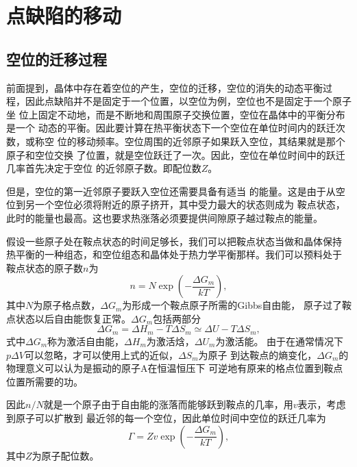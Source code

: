     \section{点缺陷的移动}
        \subsection{空位的迁移过程}
            前面提到，晶体中存在着空位的产生，空位的迁移，空位的消失的动态平衡过
            程，因此点缺陷并不是固定于一个位置，以空位为例，空位也不是固定于一个原子坐
            位上固定不动地，而是不断地和周围原子交换位置，空位在晶体中的平衡分布是一个
            动态的平衡。因此要计算在热平衡状态下一个空位在单位时间内的跃迁次数，或称空
            位的移动频率。空位周围的近邻原子如果跃入空位，其结果就是那个原子和空位交换
            了位置，就是空位跃迁了一次。因此，空位在单位时间中的跃迁几率首先决定于空位
            的近邻原子数。即配位数$Z$。
            
            但是，空位的第一近邻原子要跃入空位还需要具备有适当
            的能量。这是由于从空位到另一个空位必须将附近的原子挤开，其中受力最大的状态则成为
            鞍点状态，此时的能量也最高。这也要求热涨落必须要提供间隙原子越过鞍点的能量。

            假设一些原子处在鞍点状态的时间足够长，我们可以把鞍点状态当做和晶体保持
            热平衡的一种组态，和空位组态和晶体处于热力学平衡那样。我们可以预料处于
            鞍点状态的原子数$n$为
            \begin{equation}
                n=N\exp\left( -\frac{\Delta G_m}{kT} \right),
            \end{equation}
            其中$N$为原子格点数，$\Delta G_m$为形成一个鞍点原子所需的Gibbs自由能，
            原子过了鞍点状态以后自由能恢复正常。$\Delta G_m$包括两部分
            \begin{equation}
                \Delta G_m=\Delta H_m-T\Delta S_m\simeq \Delta U-T\Delta S_m,                
            \end{equation}
            式中$\Delta G_m$称为激活自由能，$\Delta H_m$为激活焓，$\Delta U_m$为激活能。
            由于在通常情况下$p\Delta V$可以忽略，才可以使用上式的近似，$\Delta S_m$为原子
            到达鞍点的熵变化，$\Delta G_m$的物理意义可以认为是振动的原子A在恒温恒压下
            可逆地有原来的格点位置到鞍点位置所需要的功。
            
            因此$n/N$就是一个原子由于自由能的涨落而能够跃到鞍点的几率，用$v$表示，考虑到原子可以扩散到
            最近邻的每一个空位，因此单位时间中空位的跃迁几率为
            \begin{equation}
                \Gamma=Zv\exp{\left( -\frac{\Delta G_m}{kT} \right)},
            \end{equation}
            其中$Z$为原子配位数。
